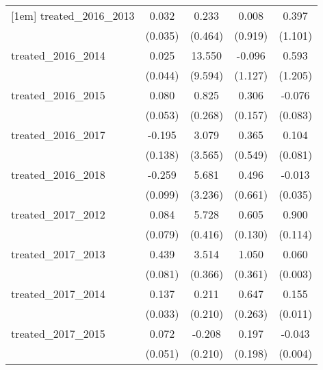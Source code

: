{\begin{tabular}{l*{4}{c}}
[1em]
treated\_2016\_2013&       0.032         &       0.233         &       0.008         &       0.397         \\
            &     (0.035)         &     (0.464)         &     (0.919)         &     (1.101)         \\
[1em]
treated\_2016\_2014&       0.025         &      13.550         &      -0.096         &       0.593         \\
            &     (0.044)         &     (9.594)         &     (1.127)         &     (1.205)         \\
[1em]
treated\_2016\_2015&       0.080         &       0.825\sym{**} &       0.306         &      -0.076         \\
            &     (0.053)         &     (0.268)         &     (0.157)         &     (0.083)         \\
[1em]
treated\_2016\_2017&      -0.195         &       3.079         &       0.365         &       0.104         \\
            &     (0.138)         &     (3.565)         &     (0.549)         &     (0.081)         \\
[1em]
treated\_2016\_2018&      -0.259\sym{**} &       5.681         &       0.496         &      -0.013         \\
            &     (0.099)         &     (3.236)         &     (0.661)         &     (0.035)         \\
[1em]
treated\_2017\_2012&       0.084         &       5.728\sym{***}&       0.605\sym{***}&       0.900\sym{***}\\
            &     (0.079)         &     (0.416)         &     (0.130)         &     (0.114)         \\
[1em]
treated\_2017\_2013&       0.439\sym{***}&       3.514\sym{***}&       1.050\sym{**} &       0.060\sym{***}\\
            &     (0.081)         &     (0.366)         &     (0.361)         &     (0.003)         \\
[1em]
treated\_2017\_2014&       0.137\sym{***}&       0.211         &       0.647\sym{*}  &       0.155\sym{***}\\
            &     (0.033)         &     (0.210)         &     (0.263)         &     (0.011)         \\
[1em]
treated\_2017\_2015&       0.072         &      -0.208         &       0.197         &      -0.043\sym{***}\\
            &     (0.051)         &     (0.210)         &     (0.198)         &     (0.004)         \\

\end{tabular}}
